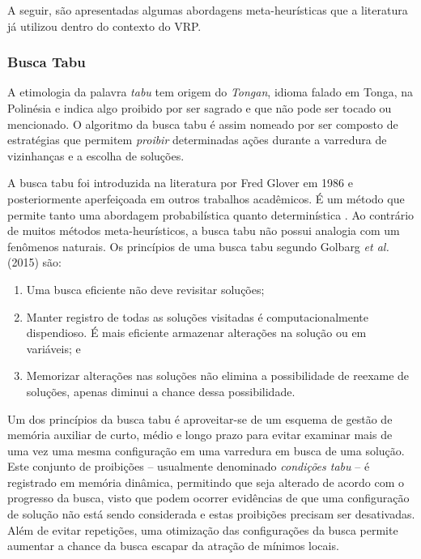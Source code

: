 A seguir, são apresentadas algumas abordagens meta-heurísticas que a literatura já utilizou dentro do contexto do VRP.

\subsubsection{Busca Tabu}

A etimologia da palavra \emph{tabu} tem origem do \emph{Tongan}, idioma falado em Tonga, na Polinésia e indica algo proibido por ser sagrado e que não pode ser tocado ou mencionado. O algoritmo da busca tabu é assim nomeado por ser composto de estratégias que permitem \emph{proibir} determinadas ações durante a varredura de vizinhanças e a escolha de soluções.

A busca tabu foi introduzida na literatura por Fred Glover em 1986 \cite{GLOVER1986533} e posteriormente aperfeiçoada em outros trabalhos acadêmicos. É um método que permite tanto uma abordagem probabilística \cite{crainic1993dynamic} quanto determinística \cite{ongsakul2004unit}. Ao contrário de muitos métodos meta-heurísticos, a busca tabu não possui analogia com um fenômenos naturais. Os princípios de uma busca tabu segundo Golbarg \emph{et al.} (2015) são:
\begin{enumerate}
    \item Uma busca eficiente não deve revisitar soluções;
    \item Manter registro de todas as soluções visitadas é computacionalmente dispendioso. É mais eficiente armazenar alterações na solução ou em variáveis; e
    \item Memorizar alterações nas soluções não elimina a possibilidade de reexame de soluções, apenas diminui a chance dessa possibilidade.
\end{enumerate}

Um dos princípios da busca tabu é aproveitar-se de um esquema de gestão de memória auxiliar de curto, médio e longo prazo para evitar examinar mais de uma vez uma mesma configuração em uma varredura em busca de uma solução. Este conjunto de proibições -- usualmente denominado \emph{condições tabu} -- é registrado em memória dinâmica, permitindo que seja alterado de acordo com o progresso da busca, visto que podem ocorrer evidências de que uma configuração de solução não está sendo considerada e estas proibições precisam ser desativadas. Além de evitar repetições, uma otimização das configurações da busca permite aumentar a chance da busca escapar da atração de mínimos locais. 

